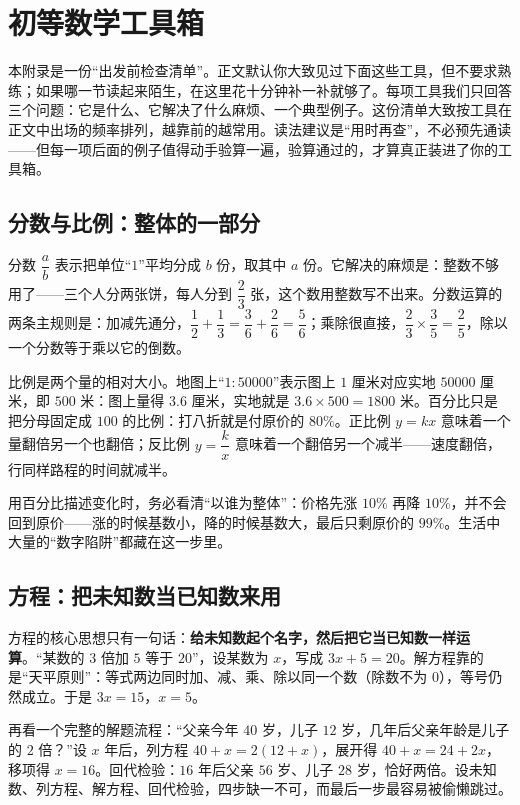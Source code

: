 \chapter{初等数学工具箱}

本附录是一份“出发前检查清单”。正文默认你大致见过下面这些工具，但不要求熟练；如果哪一节读起来陌生，在这里花十分钟补一补就够了。每项工具我们只回答三个问题：它是什么、它解决了什么麻烦、一个典型例子。这份清单大致按工具在正文中出场的频率排列，越靠前的越常用。读法建议是“用时再查”，不必预先通读——但每一项后面的例子值得动手验算一遍，验算通过的，才算真正装进了你的工具箱。

\section{分数与比例：整体的一部分}

分数 $\dfrac{a}{b}$ 表示把单位“$1$”平均分成 $b$ 份，取其中 $a$ 份。它解决的麻烦是：整数不够用了——三个人分两张饼，每人分到 $\dfrac{2}{3}$ 张，这个数用整数写不出来。分数运算的两条主规则是：加减先通分，$\dfrac{1}{2}+\dfrac{1}{3}=\dfrac{3}{6}+\dfrac{2}{6}=\dfrac{5}{6}$；乘除很直接，$\dfrac{2}{3}\times\dfrac{3}{5}=\dfrac{2}{5}$，除以一个分数等于乘以它的倒数。

比例是两个量的相对大小。地图上“$1:50000$”表示图上 $1$ 厘米对应实地 $50000$ 厘米，即 $500$ 米：图上量得 $3.6$ 厘米，实地就是 $3.6\times500=1800$ 米。百分比只是把分母固定成 $100$ 的比例：打八折就是付原价的 $80\%$。正比例 $y=kx$ 意味着一个量翻倍另一个也翻倍；反比例 $y=\dfrac{k}{x}$ 意味着一个翻倍另一个减半——速度翻倍，行同样路程的时间就减半。

用百分比描述变化时，务必看清“以谁为整体”：价格先涨 $10\%$ 再降 $10\%$，并不会回到原价——涨的时候基数小，降的时候基数大，最后只剩原价的 $99\%$。生活中大量的“数字陷阱”都藏在这一步里。

\section{方程：把未知数当已知数来用}

方程的核心思想只有一句话：\textbf{给未知数起个名字，然后把它当已知数一样运算}。“某数的 $3$ 倍加 $5$ 等于 $20$”，设某数为 $x$，写成 $3x+5=20$。解方程靠的是“天平原则”：等式两边同时加、减、乘、除以同一个数（除数不为 $0$），等号仍然成立。于是 $3x=15$，$x=5$。

再看一个完整的解题流程：“父亲今年 $40$ 岁，儿子 $12$ 岁，几年后父亲年龄是儿子的 $2$ 倍？”设 $x$ 年后，列方程 $40+x=2(12+x)$，展开得 $40+x=24+2x$，移项得 $x=16$。回代检验：$16$ 年后父亲 $56$ 岁、儿子 $28$ 岁，恰好两倍。设未知数、列方程、解方程、回代检验，四步缺一不可，而最后一步最容易被偷懒跳过。

